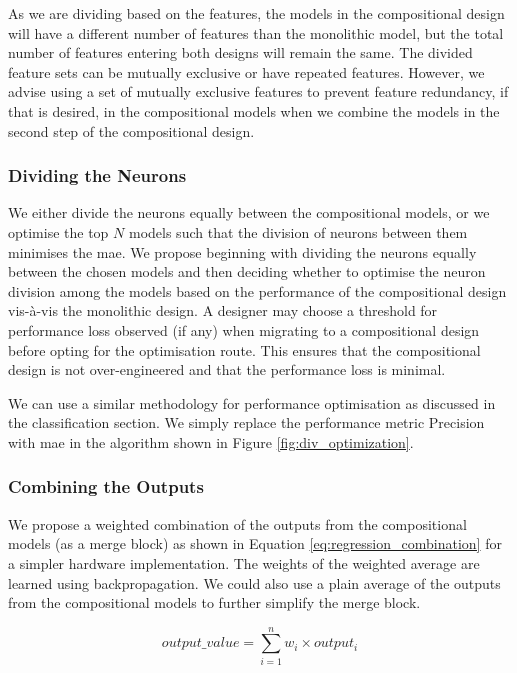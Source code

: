 As we are dividing based on the features, the models in the compositional design will have a different number of features than the monolithic model, but the total number of features entering both designs will remain the same. The divided feature sets can be mutually exclusive or have repeated features. However, we advise using a set of mutually exclusive features to prevent feature redundancy, if that is desired, in the compositional models when we combine the models in the second step of the compositional design.


\subsubsection{Dividing the Neurons}

We either divide the neurons equally between the compositional models, or we optimise the top $N$ models such that the division of neurons between them minimises the \gls{mae}. We propose beginning with dividing the neurons equally between the chosen models and then deciding whether to optimise the neuron division among the models based on the performance of the compositional design vis-à-vis the monolithic design. A designer may choose a threshold for performance loss observed (if any) when migrating to a compositional design before opting for the optimisation route. This ensures that the compositional design is not over-engineered and that the performance loss is minimal.

We can use a similar methodology for performance optimisation as discussed in the classification section. We simply replace the performance metric Precision with \gls{mae} in the algorithm shown in Figure \ref{fig:div_optimization}. 



\subsubsection{Combining the Outputs}

We propose a weighted combination of the outputs from the compositional models (as a merge block) as shown in Equation \ref{eq:regression_combination} for a simpler hardware implementation. The weights of the weighted average are learned using backpropagation. We could also use a plain average of the outputs from the compositional models to further simplify the merge block.

\begin{equation}
output\_value = \sum_{i=1}^{n} w_{i} \times output_{i}
\label{eq:regression_combination}
\end{equation}

